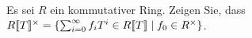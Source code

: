 %       
% 
% 
%       
%       


\begin{question}[subtitle = Die Einheitengruppe des Potenzreihenrings]
  \label{question: unit group of the power series ring}
  Es sei $R$ ein kommutativer Ring.
  Zeigen Sie, dass $R[\![T]\!]^\times = \{\sum_{i=0}^\infty f_i T^i \in R[\![T]\!] \mid f_0 \in R^\times\}$.
\end{question}


